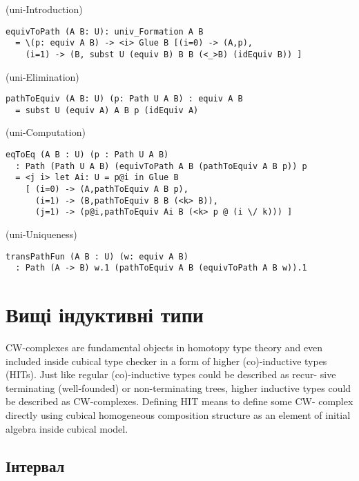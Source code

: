 \begin{definition} (uni-Introduction)
\begin{lstlisting}
equivToPath (A B: U): univ_Formation A B
  = \(p: equiv A B) -> <i> Glue B [(i=0) -> (A,p),
    (i=1) -> (B, subst U (equiv B) B B (<_>B) (idEquiv B)) ]
\end{lstlisting}
\end{definition}

\begin{definition} (uni-Elimination)
\begin{lstlisting}
pathToEquiv (A B: U) (p: Path U A B) : equiv A B
  = subst U (equiv A) A B p (idEquiv A)
\end{lstlisting}
\end{definition}

\begin{definition} (uni-Computation)
\begin{lstlisting}
eqToEq (A B : U) (p : Path U A B)
  : Path (Path U A B) (equivToPath A B (pathToEquiv A B p)) p
  = <j i> let Ai: U = p@i in Glue B
    [ (i=0) -> (A,pathToEquiv A B p),
      (i=1) -> (B,pathToEquiv B B (<k> B)),
      (j=1) -> (p@i,pathToEquiv Ai B (<k> p @ (i \/ k))) ]

\end{lstlisting}
\end{definition}

\begin{definition} (uni-Uniqueness)
\begin{lstlisting}
transPathFun (A B : U) (w: equiv A B)
  : Path (A -> B) w.1 (pathToEquiv A B (equivToPath A B w)).1
\end{lstlisting}
\end{definition}

\section{Вищі індуктивні типи}
CW-complexes are fundamental objects in homotopy type theory and even
included inside cubical type checker in a form of higher (co)-inductive
types (HITs). Just like regular (co)-inductive types could be described
as recur- sive terminating (well-founded) or non-terminating trees,
higher inductive types could be described as CW-complexes.
Defining HIT means to define some CW- complex directly using
cubical homogeneous composition structure as an element
of initial algebra inside cubical model.

\subsection{Інтервал}

